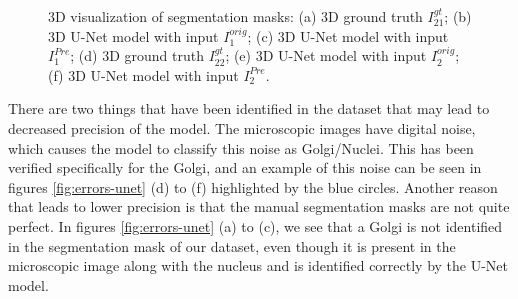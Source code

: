 \begin{figure}[!htb]
\hfil 
{}\hfil
{}
\caption{3D visualization of segmentation masks: (a) 3D ground truth $I^{gt}_{21}$; (b) 3D U-Net model with input $I^{orig}_1$; (c) 3D U-Net model with input $I^{Pre}_1$; (d) 3D ground truth $I^{gt}_{22}$; (e) 3D U-Net model with input $I^{orig}_2$; (f) 3D U-Net model with input $I^{Pre}_2$.}

\label{fig:results-unet}

\end{figure}

There are two things that have been identified in the dataset that may lead to decreased precision of the model. The microscopic images have digital noise, which causes the model to classify this noise as Golgi/Nuclei. This has been verified specifically for the Golgi, and an example of this noise can be seen in figures \ref{fig:errors-unet} (d) to (f) highlighted by the blue circles. Another reason that leads to lower precision is that the manual segmentation masks are not quite perfect. In figures \ref{fig:errors-unet} (a) to (c), we see that a Golgi is not identified in the segmentation mask  of our dataset, even though it is present in the microscopic image along with the nucleus and is identified correctly by the U-Net model.

